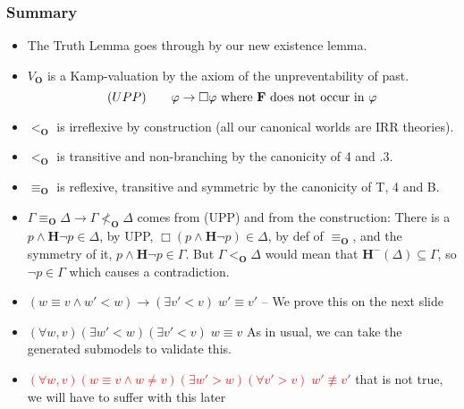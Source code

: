 \documentclass[xcolor=x11names]{beamer}
\newcommand{\cemph}[1]{\textcolor{red}{#1}}
\newcommand{\FD}{\mathbf F}
\newcommand{\PB}{\mathbf H}
\newcommand{\lthen}{\rightarrow}
\newcommand{\forallp}[1]{(\forall #1)}
\newcommand{\existsp}[1]{(\exists #1)}
\begin{document}
\begin{frame}
\frametitle{Summary}
\begin{itemize}
\item The Truth Lemma goes through by our new existence lemma.
\item $V_\mathbf{O}$ is a Kamp-valuation by the axiom of the unpreventability of past.
\[ (UPP)\qquad \varphi \lthen \Box \varphi \textup{ where $\FD$ does not occur in $\varphi$}\]
\item $<_{\mathbf O}$ is irreflexive by construction (all our canonical worlds are IRR theories).
\item $<_{\mathbf O}$ is transitive and non-branching by the canonicity of 4 and .3.
\item $\equiv_{\mathbf O}$ is reflexive, transitive and symmetric by the canonicity of T, 4 and B.
\item $\Gamma \equiv_{\mathbf O} \Delta \lthen \Gamma\not <_{\mathbf O}\Delta $ comes from (UPP) and from the construction:
There is a $p\land \PB \lnot p\in \Delta$, by UPP, $\Box (p\land \PB \lnot p)\in \Delta$, by def of $\equiv_{\mathbf O}$, and the symmetry of it, $p\land \PB \lnot p\in \Gamma$.
But $\Gamma <_{\mathbf O}\Delta$ would mean that $\PB^-(\Delta)\subseteq \Gamma$, so $\lnot p\in \Gamma$ which causes a contradiction.
\item $(w \equiv v \land w'<w ) \lthen \existsp {v'<v} \;w'\equiv v'$ -- We prove this on the next slide
\item $\forallp{w,v}\existsp{w'<w}\existsp {v'<v} \;w\equiv v$ As in usual, we can take the generated submodels to validate this.
\item \cemph{$\forallp{w,v} (w \equiv v \land w\neq v) \existsp{w'>w}\forallp {v'>v} \;w'\not\equiv v'$} that is not true, we will have to suffer with this later
\end{itemize}
\end{frame}
\end{document}
